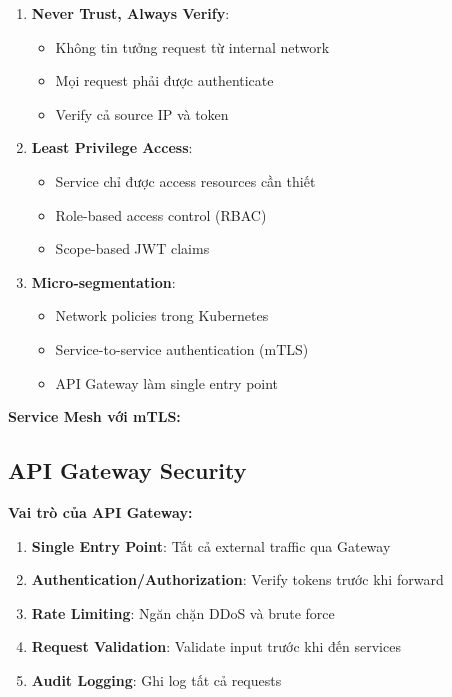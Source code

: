\begin{enumerate}
    \item \textbf{Never Trust, Always Verify}:
    \begin{itemize}
        \item Không tin tưởng request từ internal network
        \item Mọi request phải được authenticate
        \item Verify cả source IP và token
    \end{itemize}
    
    \item \textbf{Least Privilege Access}:
    \begin{itemize}
        \item Service chỉ được access resources cần thiết
        \item Role-based access control (RBAC)
        \item Scope-based JWT claims
    \end{itemize}
    
    \item \textbf{Micro-segmentation}:
    \begin{itemize}
        \item Network policies trong Kubernetes
        \item Service-to-service authentication (mTLS)
        \item API Gateway làm single entry point
    \end{itemize}
\end{enumerate}

\noindent\textbf{Service Mesh với mTLS:}


\subsection{API Gateway Security}

\noindent\textbf{Vai trò của API Gateway:}

\begin{enumerate}
    \item \textbf{Single Entry Point}: Tất cả external traffic qua Gateway
    \item \textbf{Authentication/Authorization}: Verify tokens trước khi forward
    \item \textbf{Rate Limiting}: Ngăn chặn DDoS và brute force
    \item \textbf{Request Validation}: Validate input trước khi đến services
    \item \textbf{Audit Logging}: Ghi log tất cả requests
\end{enumerate}

